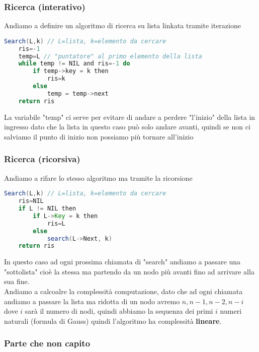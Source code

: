 \subsubsection{Ricerca (interativo)}
Andiamo a definire un algoritmo di ricerca su lista linkata tramite iterazione
\begin{lstlisting}[language=Java]
Search(L,k) // L=lista, k=elemento da cercare
	ris=-1
	temp=L // "puntatore" al primo elemento della lista
	while temp != NIL and ris=-1 do
		if temp->key = k then
			ris=k
		else
			temp = temp->next
	return ris
\end{lstlisting}
La variabile "temp" ci serve per evitare di andare a perdere "l'inizio" della lista in ingresso dato che la lista in questo caso può solo andare avanti, quindi se non ci salviamo il punto di inizio non possiamo più tornare all'inizio

\subsubsection{Ricerca (ricorsiva)}
Andiamo a rifare lo stesso algoritmo ma tramite la ricorsione
\begin{lstlisting}[language=Java]
Search(L,k) // L=lista, k=elemento da cercare
	ris=NIL
	if L != NIL then
		if L->Key = k then
			ris=L
		else
			search(L->Next, k)
	return ris
\end{lstlisting}
In questo caso ad ogni prossima chiamata di "search" andiamo a passare una "sottolista" cioè la stessa ma partendo da un nodo più avanti fino ad arrivare alla sua fine.\\
Andiamo a calcoalre la complessità computazione, dato che ad ogni chiamata andiamo a passare la lista ma ridotta di un nodo avremo $n, n-1, n-2, n-i$ dove $i$ sarà il numero di nodi, quindi abbiamo la sequenza dei primi $i$ numeri naturali (formula di Gauss) quindi l'algoritmo ha complessità \textbf{lineare}.
\subsubsection{Parte che non capito}
\blindtext